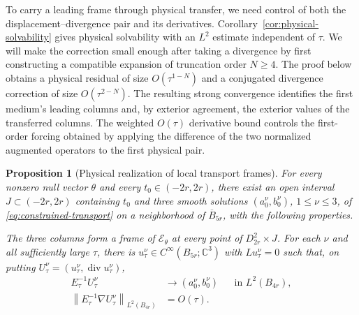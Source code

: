 \documentclass[11pt]{article}
\newcommand{\C}{\mathbb C}
\DeclareMathOperator{\diverg}{div}
\newcommand{\norm}[1]{\left\lVert #1\right\rVert}
\newcommand{\Ecal}{\mathcal E}
\newtheorem{proposition}[theorem]{Proposition}
\theoremstyle{remark}
\numberwithin{equation}{section}
\begin{document}
To carry a leading frame through physical transfer, we need control of
both the displacement--divergence pair and its derivatives.
Corollary~\ref{cor:physical-solvability} gives physical solvability with
an $L^2$ estimate independent of $\tau$. We will make the
correction small enough after taking a divergence by first constructing
a compatible expansion of truncation order $N\ge4$. The proof below
obtains a physical residual of size $O(\tau^{1-N})$ and a conjugated
divergence correction of size $O(\tau^{2-N})$. The resulting strong
convergence identifies the first medium's leading columns and, by exterior
agreement, the exterior values of the transferred columns. The weighted
$O(\tau)$ derivative bound controls the first-order forcing obtained by
applying the difference of the two normalized augmented operators to
the first physical pair.

\begin{proposition}[Physical realization of local transport frames]
\label{prop:physical-amplitudes}
For every nonzero null vector $\theta$ and every
$t_0\in(-2r,2r)$, there exist an open interval
$J\subset(-2r,2r)$ containing $t_0$ and three smooth solutions
$(a_0^{\nu},b_0^{\nu})$, $1\le\nu\le3$, of
\eqref{eq:constrained-transport} on a neighborhood of
$\overline B_{5r}$, with the following properties.

The three columns form a frame of $\Ecal_\theta$ at every point
of $D_{2r}^2\times J$. For each $\nu$ and all sufficiently large
$\tau$, there is $u_\tau^{\nu}\in C^\infty(B_{5r};\C^3)$ with
$Lu_\tau^{\nu}=0$ such that, on putting
$U_\tau^{\nu}=(u_\tau^{\nu},\diverg u_\tau^{\nu})$,
\begin{equation}
\label{eq:physical-leading-limit}
\begin{aligned}
 E_\tau^{-1}U_\tau^{\nu}
   &\longrightarrow (a_0^{\nu},b_0^{\nu})
                  &&\text{in }L^2(B_{4r}),\\
 \norm{E_\tau^{-1}\nabla U_\tau^{\nu}}_{L^2(B_{4r})}
   &=O(\tau).
\end{aligned}
\end{equation}
\end{proposition}
\end{document}
